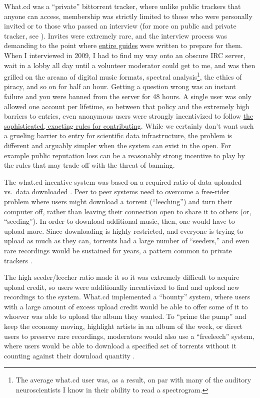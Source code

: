 \documentclass[11pt]{article}
\begin{document}
\begin{multicols}{2}
What.cd was a ``private'' bittorrent tracker, where unlike public
trackers that anyone can access, membership was strictly limited to
those who were personally invited or to those who passed an interview
(for more on public and private tracker, see \cite{meulpolderPublicPrivateBitTorrent} ). Invites were extremely rare,
and the interview process was demanding to the point where
\href{https://opentrackers.org/whatinterviewprep.com/index.html}{entire
guides} were written to prepare for them. When I interviewed in 2009, I
had to find my way onto an obscure IRC server, wait in a lobby all day
until a volunteer moderator could get to me, and was then grilled on the
arcana of digital music formats, spectral analysis\footnote{The average
  what.cd user was, as a result, on par with many of the auditory
  neuroscientists I know in their ability to read a spectrogram.}, the
ethics of piracy, and so on for half an hour. Getting a question wrong
was an instant failure and you were banned from the server for 48 hours.
A single user was only allowed one account per lifetime, so between that
policy and the extremely high barriers to entries, even anonymous users
were strongly incentivized to follow
\href{https://opentrackers.org/whatinterviewprep.com/prepare-for-the-interview/what-cd-rules/index.html}{the
sophisticated, exacting rules for contributing}. While we certainly
don't want such a grueling barrier to entry for scientific data
infrastructure, the problem is different and arguably simpler when the
system can exist in the open. For example public reputation loss can be
a reasonably strong incentive to play by the rules that may trade off
with the threat of banning.

The what.cd incentive system was based on a required ratio of data
uploaded vs.~data downloaded \cite{jiaHowSurviveThrive2013} .
Peer to peer systems need to overcome a free-rider problem where users
might download a torrent (``leeching'') and turn their computer off,
rather than leaving their connection open to share it to others (or,
``seeding''). In order to download additional music, then, one would
have to upload more. Since downloading is highly restricted, and
everyone is trying to upload as much as they can, torrents had a large
number of ``seeders,'' and even rare recordings would be sustained for
years, a pattern common to private trackers \cite{liuUnderstandingImprovingRatio2010} .

The high seeder/leecher ratio made it so it was extremely difficult to
acquire upload credit, so users were additionally incentivized to find
and upload new recordings to the system. What.cd implemented a
``bounty'' system, where users with a large amount of excess upload
credit would be able to offer some of it to whoever was able to upload
the album they wanted. To ``prime the pump'' and keep the economy
moving, highlight artists in an album of the week, or direct users to
preserve rare recordings, moderators would also use a ``freeleech''
system, where users would be able to download a specified set of
torrents without it counting against their download quantity \cite{kashEconomicsBitTorrentCommunities2012
chenImprovingSustainabilityPrivate2011a} .


\end{multicols}
\end{document}
